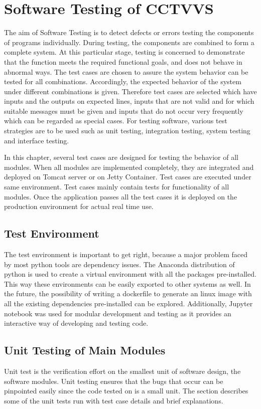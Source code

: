 \chapter{Software Testing of CCTVVS}
The aim of Software Testing is to detect defects or errors testing the
components of programs individually. During testing, the components are
combined to form a complete system. At this particular stage, testing is
concerned to demonstrate that the function meets the required functional goals,
and does not behave in abnormal ways. The test cases are chosen to assure the
system behavior can be tested for all combinations. Accordingly, the expected
behavior of the system under different combinations is given. Therefore test
cases are selected which have inputs and the outputs on expected lines, inputs
that are not valid and for which suitable messages must be given and inputs that
do not occur very frequently which can be regarded as special cases. For testing
software, various test strategies are to be used such as unit testing,
integration testing, system testing and interface testing.

In this chapter, several test cases are designed for testing the behavior of
all modules. When all modules are implemented completely, they are integrated
and deployed on Tomcat server or on Jetty Container. Test cases are executed
under same environment. Test cases mainly contain tests for functionality of
all modules. Once the application passes all the test cases it is deployed on
the production environment for actual real time use.

\section{Test Environment}
The test environment is important to get right, because a major problem faced
by most python tools are dependency issues. The Anaconda distribution of
python is used to create a virtual environment with all the packages
pre-installed. This way these environments can be easily exported to other
systems as well. In the future, the possibility of writing a dockerfile to
generate an linux image with all the existing dependencies pre-installed can be
explored. Additionally, Jupyter notebook was used for modular development and
testing as it provides an interactive way of developing and testing code.

\section{Unit Testing of Main Modules}
Unit test is the verification effort on the smallest unit of software design,
the software modules. Unit testing ensures that the bugs that occur can be
pinpointed easily since the code tested on is a small unit. The section
describes some of the unit tests run with test case details and brief
explanations.

